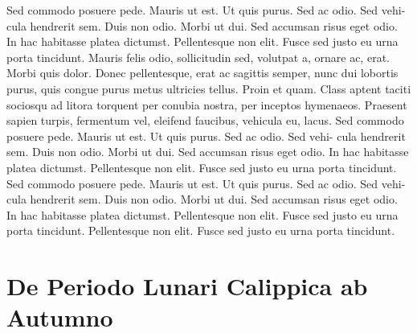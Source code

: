 \documentclass[12pt,twoside,a4paper]{book}
\begin{document}
%
%  

\lipsum

Sed commodo posuere pede. Mauris ut est. Ut quis purus. Sed ac odio.
Sed vehi- cula hendrerit sem. Duis non odio. Morbi ut dui.
Sed accumsan risus eget odio. In hac habitasse platea dictumst.
Pellentesque non elit. Fusce sed justo eu urna porta tincidunt.
Mauris felis odio, sollicitudin sed, volutpat a, ornare ac, erat.
Morbi quis dolor. Donec pellentesque, erat ac sagittis semper,
nunc dui lobortis purus, quis congue purus metus ultricies tellus.
Proin et quam. Class aptent taciti sociosqu ad litora torquent per
conubia nostra, per inceptos hymenaeos.
Praesent sapien turpis, fermentum vel, eleifend faucibus, vehicula eu,
lacus.
Sed commodo posuere pede. Mauris ut est. Ut quis purus. Sed ac odio.
Sed vehi- cula hendrerit sem. Duis non odio. Morbi ut dui.
Sed accumsan risus eget odio. In hac habitasse platea dictumst.
Pellentesque non elit. Fusce sed justo eu urna porta tincidunt.
Sed commodo posuere pede. Mauris ut est. Ut quis purus. Sed ac odio.
Sed vehi- cula hendrerit sem. Duis non odio. Morbi ut dui.
Sed accumsan risus eget odio. In hac habitasse platea dictumst.
Pellentesque non elit. Fusce sed justo eu urna porta tincidunt.
Pellentesque non elit. Fusce sed justo eu urna porta tincidunt.



\section{De Periodo Lunari Calippica ab Autumno}

\lipsum[150]

\listoftables
\end{document}
